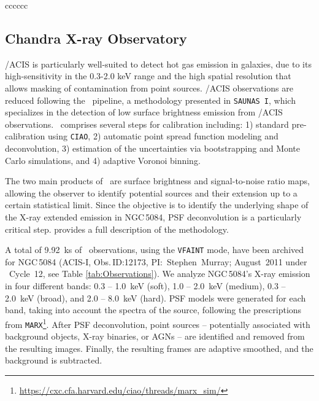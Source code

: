 \documentclass[modern]{CORE-AAS/aastex631}
\begin{document}
{\begin{deluxetable*}{cccccc}
\enddata
{}
\end{deluxetable*}

\subsection{Chandra X-ray Observatory} \label{sec:data_chandra}

\Chandra/ACIS is particularly well-suited to detect hot gas emission in galaxies, due to its high-sensitivity in the 0.3-2.0 keV range and the high spatial resolution that allows masking of contamination from point sources. \Chandra/ACIS observations are reduced following the \SAUNAS\ pipeline, a methodology presented in \texttt{SAUNAS I}, which specializes in the detection of low surface brightness emission from \Chandra/ACIS observations. \SAUNAS\ comprises several steps for calibration including: 1) standard pre-calibration using \texttt{CIAO}, 2) automatic point spread function modeling and deconvolution, 3) estimation of the uncertainties via bootstrapping and Monte Carlo simulations, and 4) adaptive Voronoi binning. \par 
The two main products of \SAUNAS\ are surface brightness and signal-to-noise ratio maps, allowing the observer to identify potential sources and their extension up to a certain statistical limit. Since the objective is to identify the underlying shape of the X-ray extended emission in NGC\,5084, PSF deconvolution is a particularly critical step. \citet{borlaff+2024apj967_169} provides a full description of the methodology.

A total of 9.92~ks of \Chandra\ observations, using the \texttt{VFAINT} mode, have been archived for NGC\,5084 (ACIS-I, Obs.\,ID:12173, PI:~Stephen~Murray; August~2011 under \Chandra\ Cycle~12, see Table \ref{tab:Observations}). We analyze NGC\,5084's X-ray emission in four different bands: 0.3 -- 1.0~keV (soft), 1.0 -- 2.0~keV (medium), 0.3 -- 2.0~keV (broad), and 2.0 -- 8.0~keV (hard). PSF models were generated for each band, taking into account the spectra of the source, following the prescriptions from \texttt{MARX}\footnote{\url{https://cxc.cfa.harvard.edu/ciao/threads/marx_sim/}}. After PSF deconvolution, point sources -- potentially associated with background objects, X-ray binaries, or AGNs -- are identified and removed from the resulting images. Finally, the resulting frames are adaptive smoothed, and the background is subtracted. 

}
\end{document}
